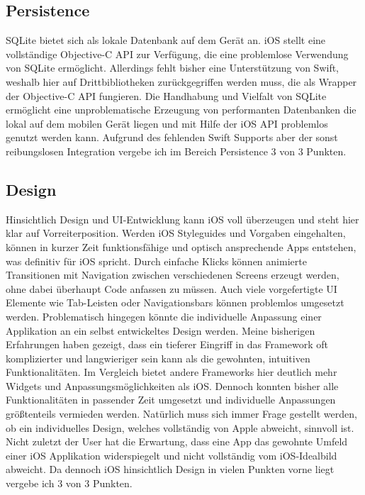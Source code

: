 \subsection{Persistence}
SQLite bietet sich als lokale Datenbank auf dem Gerät an. iOS stellt eine vollständige Objective-C API zur Verfügung, die eine problemlose Verwendung von SQLite ermöglicht. Allerdings fehlt bisher eine Unterstützung von Swift, weshalb hier auf Drittbibliotheken zurückgegriffen werden muss, die als Wrapper der Objective-C API fungieren. Die Handhabung und Vielfalt von SQLite ermöglicht eine unproblematische Erzeugung von performanten Datenbanken die lokal auf dem mobilen Gerät liegen und mit Hilfe der iOS API problemlos genutzt werden kann. Aufgrund des fehlenden Swift Supports aber der sonst reibungslosen Integration vergebe ich im Bereich Persistence 3 von 3 Punkten.
\subsection{Design}
Hinsichtlich Design und UI-Entwicklung kann iOS voll über\-zeugen und steht hier klar auf Vorreiterposition. Werden iOS Styleguides und Vorgaben eingehalten, können in kurzer Zeit funktionsfähige und optisch ansprechende Apps entstehen, was definitiv für iOS spricht. Durch einfache Klicks können animierte Transitionen mit Navigation zwischen verschiedenen Screens erzeugt werden, ohne dabei überhaupt Code anfassen zu müssen. Auch viele vorgefertigte UI Elemente wie Tab-Leisten oder Navigationsbars können problemlos umgesetzt werden. Problematisch hingegen könnte die individuelle Anpassung einer Applikation an ein selbst entwickeltes Design werden. Meine bisherigen Erfahrungen haben gezeigt, dass ein tieferer Eingriff in das Framework oft komplizierter und langwieriger sein kann als die gewohnten, intuitiven Funktionalitäten. Im Vergleich bietet andere Frameworks hier deutlich mehr Widgets und Anpassungsmöglichkeiten als iOS. Dennoch konnten bisher alle Funktionalitäten in passender Zeit umgesetzt und individuelle Anpassungen größtenteils vermieden werden. Natürlich muss sich immer Frage gestellt werden, ob ein individuelles Design, welches vollständig von Apple abweicht, sinnvoll ist. Nicht zuletzt der User hat die Erwartung, dass eine App das gewohnte Umfeld einer iOS Applikation widerspiegelt und nicht vollständig vom iOS-Idealbild abweicht. Da dennoch iOS hinsichtlich Design in vielen Punkten vorne liegt vergebe ich 3 von 3 Punkten.
